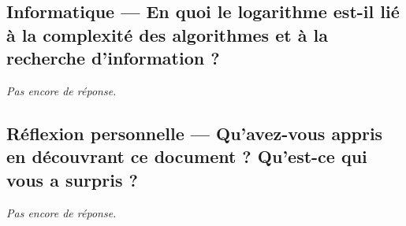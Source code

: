 \documentclass[11pt,a4paper]{article}
\begin{document}
\subsection*{Informatique --- En quoi le logarithme est-il lié à la complexité des algorithmes et à la recherche d'information ?}
\emph{Pas encore de réponse.}

\subsection*{Réflexion personnelle --- Qu'avez-vous appris en découvrant ce document ? Qu'est-ce qui vous a surpris ?}
\emph{Pas encore de réponse.}
\end{document}
